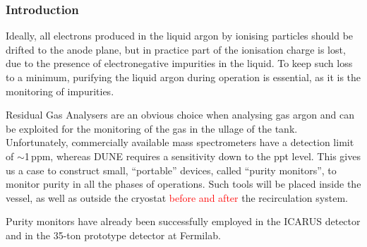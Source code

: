 \subsubsection{Introduction}
\label{sec:prm-intro}
Ideally, all electrons produced in the liquid argon by ionising particles should be drifted to the anode plane, but in practice part of the ionisation charge is lost, due to the presence of electronegative impurities in the liquid. To keep such loss to a minimum, purifying the liquid argon during operation is essential, as it is the monitoring of impurities.

Residual Gas Analysers are an obvious choice when analysing gas argon and can be exploited for the monitoring of the gas in the ullage of the tank. Unfortunately, commercially available mass spectrometers have a detection limit of $\sim$1\,ppm, whereas DUNE requires a sensitivity down to the ppt level. This gives us a case to construct small, ``portable'' devices, called ``purity monitors'', to monitor purity in all the phases of operations. Such tools will be placed inside the vessel, as well as outside the cryostat \textcolor{red}{before and after} the recirculation system.

Purity monitors have already been successfully employed in the ICARUS detector and in the 35-ton prototype detector at Fermilab.
